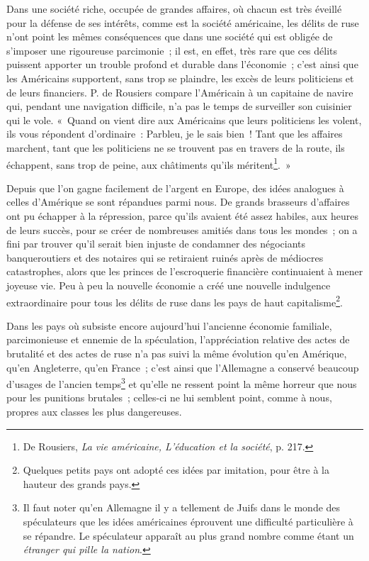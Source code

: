 \documentclass[french,twoside]{book} %
\begin{document}
Dans une société riche, occupée de grandes affaires, où chacun est très éveillé pour la défense de ses intérêts, comme est la société américaine, les délits de ruse n’ont point les mêmes conséquences que dans une société qui est obligée de s’imposer une rigoureuse parcimonie ; il est, en effet, très rare que ces délits puissent apporter un trouble profond et durable dans l’économie ; c’est ainsi que les Américains supportent, sans trop se plaindre, les excès de leurs politiciens et de leurs financiers. P. de Rousiers compare l’Américain à un capitaine de navire qui, pendant une navigation difficile, n’a pas le temps de surveiller son cuisinier qui le vole. « Quand on vient dire aux Américains que leurs politiciens les volent, ils vous répondent d’ordinaire : Parbleu, je le sais bien ! Tant que les affaires marchent, tant que les politiciens ne se trouvent pas en travers de la route, ils échappent, sans trop de peine, aux châtiments qu’ils méritent\footnote{ \noindent De Rousiers, \emph{La vie américaine, L’éducation et la société}, p. 217.
 }. »\par
Depuis que l’on gagne facilement de l’argent en Europe, des idées analogues à celles d’Amérique se sont répandues parmi nous. De grands brasseurs d’affaires ont pu échapper à la répression, parce qu’ils avaient été assez habiles, aux heures de leurs succès, pour se créer de nombreuses amitiés dans tous les mondes ; on a fini par trouver qu’il serait bien injuste de condamner des négociants  banqueroutiers et des notaires qui se retiraient ruinés après de médiocres catastrophes, alors que les princes de l’escroquerie financière continuaient à mener joyeuse vie. Peu à peu la nouvelle économie a créé une nouvelle indulgence extraordinaire pour tous les délits de ruse dans les pays de haut capitalisme\footnote{ \noindent Quelques petits pays ont adopté ces idées par imitation, pour être à la hauteur des grands pays.
 }.\par
Dans les pays où subsiste encore aujourd’hui l’ancienne économie familiale, parcimonieuse et ennemie de la spéculation, l’appréciation relative des actes de brutalité et des actes de ruse n’a pas suivi la même évolution qu’en Amérique, qu’en Angleterre, qu’en France ; c’est ainsi que l’Allemagne a conservé beaucoup d’usages de l’ancien temps\footnote{ \noindent Il faut noter qu’en Allemagne il y a tellement de Juifs dans le monde des spéculateurs que les idées américaines éprouvent une difficulté particulière à se répandre. Le spéculateur apparaît au plus grand nombre comme étant un \emph{étranger qui pille la nation}.
 } et qu’elle ne ressent point la même horreur que nous pour les punitions brutales ; celles-ci ne lui semblent point, comme à nous, propres aux classes les plus dangereuses.\par
\end{document}
